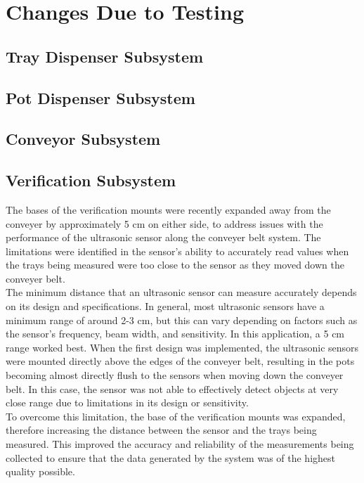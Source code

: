 \documentclass[12pt, titlepage]{article}
\begin{document}
\section{Changes Due to Testing}
\subsection{Tray Dispenser Subsystem}

\subsection{Pot Dispenser Subsystem}

\subsection{Conveyor Subsystem}

\subsection{Verification Subsystem}

The bases of the verification mounts were recently expanded away from the conveyer by approximately 5 cm on either side, to address issues with the performance of the ultrasonic sensor along the conveyer belt system. The limitations were identified in the sensor's ability to accurately read values when the trays being measured were too close to the sensor as they moved down the conveyer belt.
\\ The minimum distance that an ultrasonic sensor can measure accurately depends on its design and specifications. In general, most ultrasonic sensors have a minimum range of around 2-3 cm, but this can vary depending on factors such as the sensor's frequency, beam width, and sensitivity. In this application, a 5 cm range worked best. When the first design was implemented, the ultrasonic sensors were mounted directly above the edges of the conveyer belt, resulting in the pots becoming almost directly flush to the sensors when moving down the conveyer belt. In this case, the sensor was not able to effectively detect objects at very close range due to limitations in its design or sensitivity.
\\ To overcome this limitation, the base of the verification mounts was expanded, therefore increasing the distance between the sensor and the trays being measured. This improved the accuracy and reliability of the measurements being collected to ensure that the data generated by the system was of the highest quality possible.
\end{document}
